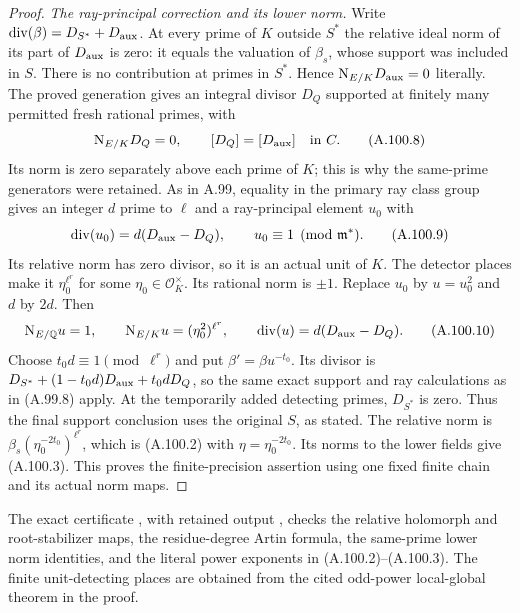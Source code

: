 \begin{proof}
\emph{The ray-principal correction and its lower norm.}
Write $\operatorname{div}(\beta)=D_{S^*}+D_{\rm aux}$.
At every prime of $K$ outside $S^*$ the relative
ideal norm of its part of $D_{\rm aux}$ is zero:
it equals the valuation of $\beta_s$, whose support
was included in $S$.
There is no contribution at primes in $S^*$.
Hence $\mathrm N_{E/K}D_{\rm aux}=0$ literally.
The proved generation gives an integral divisor
$D_Q$ supported at finitely many permitted fresh
rational primes, with
\[
 \mathrm N_{E/K}D_Q=0,\qquad
                 [D_Q]=[D_{\rm aux}]\quad\text{in }C.
 \tag{A.100.8}
\]
Its norm is zero separately above each prime of $K$;
this is why the same-prime generators were retained.
As in A.99, equality in the primary ray class group
gives an integer $d$ prime to $\ell$ and a ray-principal
element $u_0$ with
\[
 \operatorname{div}(u_0)=d(D_{\rm aux}-D_Q),
                         \qquad u_0\equiv1\pmod{\mathfrak m^*}.
 \tag{A.100.9}
\]
Its relative norm has zero divisor, so it is an
actual unit of $K$.
The detector places make it $\eta_0^{\ell^r}$ for
some $\eta_0\in\mathcal O_K^\times$.
Its rational norm is $\pm1$.
Replace $u_0$ by $u=u_0^2$ and $d$ by $2d$.
Then
\[
 \mathrm N_{E/\mathbb Q}u=1,
       \qquad \mathrm N_{E/K}u=(\eta_0^2)^{\ell^r},
       \qquad \operatorname{div}(u)=d(D_{\rm aux}-D_Q).
 \tag{A.100.10}
\]
Choose $t_0d\equiv1\pmod{\ell^r}$ and put
$\beta'=\beta u^{-t_0}$.
Its divisor is
$D_{S^*}+(1-t_0d)D_{\rm aux}+t_0dD_Q$,
so the same exact support and ray calculations as
in (A.99.8) apply.
At the temporarily added detecting primes,
$D_{S^*}$ is zero.  Thus the final support conclusion
uses the original $S$, as stated.
The relative norm is
$\beta_s(\eta_0^{-2t_0})^{\ell^r}$, which is (A.100.2)
with $\eta=\eta_0^{-2t_0}$.
Its norms to the lower fields give (A.100.3).
This proves the finite-precision assertion using one
fixed finite chain and its actual norm maps.
\end{proof}

\noindent The exact certificate
, with retained output
, checks the
relative holomorph and root-stabilizer maps, the residue-degree
Artin formula, the same-prime lower norm identities, and the
literal power exponents in (A.100.2)--(A.100.3).
The finite unit-detecting places are obtained from the cited
odd-power local-global theorem in the proof.
